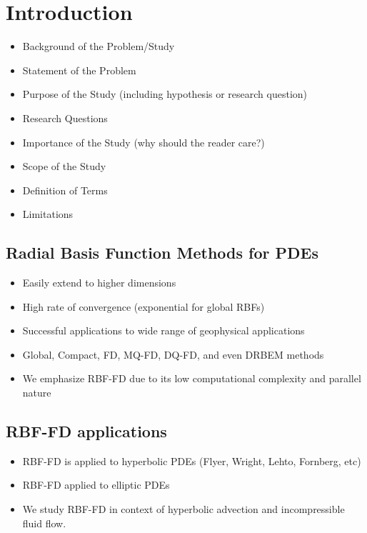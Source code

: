 \chapter{Introduction}

\begin{itemize} 
	\item Background of  the Problem/Study
	\item Statement of the Problem 
	\item Purpose of the Study (including hypothesis or research question)
	\item Research Questions
	\item Importance of the Study (why should the reader care?)
	\item Scope of the Study
	\item Definition of Terms
	\item Limitations
\end{itemize} 


\section{Radial Basis Function Methods for PDEs}

\begin{itemize}
\item Easily extend to higher dimensions
\item High rate of convergence (exponential for global RBFs)
\item Successful applications to wide range of geophysical applications
\item Global, Compact, FD, MQ-FD, DQ-FD, and even DRBEM methods
\item We emphasize RBF-FD due to its low computational complexity and parallel nature
\end{itemize} 

\section{RBF-FD applications} 
\begin{itemize} 
	\item RBF-FD is applied to hyperbolic PDEs (Flyer, Wright, Lehto, Fornberg, etc)
	\item RBF-FD applied to elliptic PDEs 
	\item We study RBF-FD in context of hyperbolic advection and incompressible fluid flow.
\end{itemize} 

